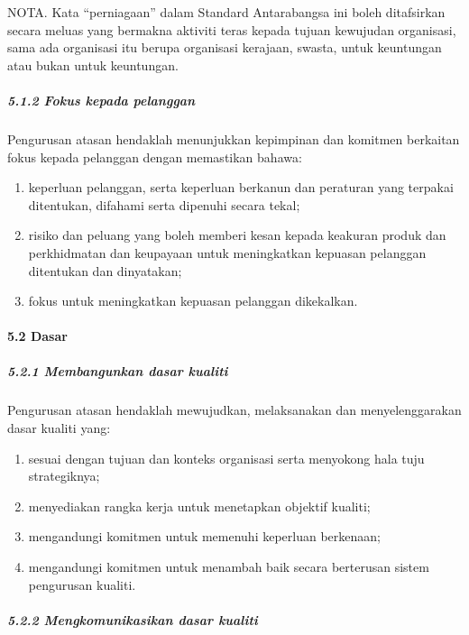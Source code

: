\documentclass[
]{article}
\begin{document}
NOTA. Kata ``perniagaan'' dalam Standard Antarabangsa ini boleh
ditafsirkan secara meluas yang bermakna aktiviti teras kepada tujuan
kewujudan organisasi, sama ada organisasi itu berupa organisasi
kerajaan, swasta, untuk keuntungan atau bukan untuk keuntungan.

\hypertarget{fokus-kepada-pelanggan}{%
\subparagraph{5.1.2 Fokus kepada
pelanggan}\label{fokus-kepada-pelanggan}}

Pengurusan atasan hendaklah menunjukkan kepimpinan dan komitmen
berkaitan fokus kepada pelanggan dengan memastikan bahawa:

\begin{enumerate}
\def\labelenumi{\alph{enumi})}
\item
  keperluan pelanggan, serta keperluan berkanun dan peraturan yang
  terpakai ditentukan, difahami serta dipenuhi secara tekal;
\item
  risiko dan peluang yang boleh memberi kesan kepada keakuran produk dan
  perkhidmatan dan keupayaan untuk meningkatkan kepuasan pelanggan
  ditentukan dan dinyatakan;
\item
  fokus untuk meningkatkan kepuasan pelanggan dikekalkan.
\end{enumerate}

\hypertarget{dasar}{%
\paragraph{5.2 Dasar}\label{dasar}}

\hypertarget{membangunkan-dasar-kualiti}{%
\subparagraph{5.2.1 Membangunkan dasar
kualiti}\label{membangunkan-dasar-kualiti}}

Pengurusan atasan hendaklah mewujudkan, melaksanakan dan
menyelenggarakan dasar kualiti yang:

\begin{enumerate}
\def\labelenumi{\alph{enumi})}
\item
  sesuai dengan tujuan dan konteks organisasi serta menyokong hala tuju
  strategiknya;
\item
  menyediakan rangka kerja untuk menetapkan objektif kualiti;
\item
  mengandungi komitmen untuk memenuhi keperluan berkenaan;
\item
  mengandungi komitmen untuk menambah baik secara berterusan sistem
  pengurusan kualiti.
\end{enumerate}

\hypertarget{mengkomunikasikan-dasar-kualiti}{%
\subparagraph{5.2.2 Mengkomunikasikan dasar
kualiti}\label{mengkomunikasikan-dasar-kualiti}}
\end{document}

